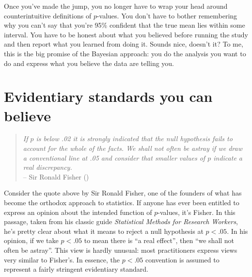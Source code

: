 \documentclass[
  11pt,
  a4paper,
  twoside,symmetric,openright]{book}
\theoremstyle{break}
\theoremstyle{break}
\begin{document}
Once you've made the jump, you no longer have to wrap your head around counterintuitive definitions of \(p\)-values. You don't have to bother remembering why you can't say that you're 95\% confident that the true mean lies within some interval. You have to be honest about what you believed before running the study and then report what you learned from doing it. Sounds nice, doesn't it? To me, this is the big promise of the Bayesian approach: you do the analysis you want to do and express what you believe the data are telling you.

\section{Evidentiary standards you can believe}\label{evidentiary-standards-you-can-believe}

\begin{quote}
\emph{If \(p\) is below .02 it is strongly indicated that the null hypothesis fails to account for the whole of the facts. We shall not often be astray if we draw a conventional line at .05 and consider that smaller values of \(p\) indicate a real discrepancy.}\\
-- Sir Ronald Fisher ()
\end{quote}

Consider the quote above by Sir Ronald Fisher, one of the founders of what has become the orthodox approach to statistics. If anyone has ever been entitled to express an opinion about the intended function of \(p\)-values, it's Fisher. In this passage, taken from his classic guide \emph{Statistical Methods for Research Workers}, he's pretty clear about what it means to reject a null hypothesis at \(p<.05\). In his opinion, if we take \(p<.05\) to mean there is ``a real effect'', then ``we shall not often be astray''. This view is hardly unusual: most practitioners express views very similar to Fisher's. In essence, the \(p<.05\) convention is assumed to represent a fairly stringent evidentiary standard.
\end{document}
